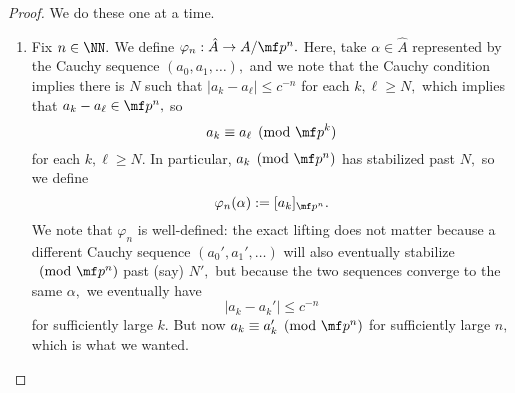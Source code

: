 \documentclass[../notes.tex]{subfiles}
\begin{document}
\begin{proof}
	We do these one at a time.
	\begin{enumerate}[label=(\alph*)]
		\item Fix $n\in\NN.$ We define $\varphi_n:\hat A\to A/\mf p^n.$ Here, take $\alpha\in\hat A$ represented by the Cauchy sequence $(a_0,a_1,\ldots),$ and we note that the Cauchy condition implies there is $N$ such that $|a_k-a_\ell|\le c^{-n}$ for each $k,\ell\ge N,$ which implies that $a_k-a_\ell\in\mf p^n,$ so
		\[a_k\equiv a_\ell\pmod{\mf p^k}\]
		for each $k,\ell\ge N.$ In particular, $a_k\pmod{\mf p^n}$ has stabilized past $N,$ so we define
		\[\varphi_n(\alpha):=[a_k]_{\mf p^n}.\]
		We note that $\varphi_n$ is well-defined: the exact lifting does not matter because a different Cauchy sequence $(a_0',a_1',\ldots)$ will also eventually stabilize$\pmod{\mf p^n}$ past (say) $N',$ but because the two sequences converge to the same $\alpha,$ we eventually have
		\[|a_k-a_k'|\le c^{-n}\]
		for sufficiently large $k.$ But now $a_k\equiv a_k'\pmod{\mf p^n}$ for sufficiently large $n,$ which is what we wanted.


\end{enumerate}
\end{proof}
\end{document}
